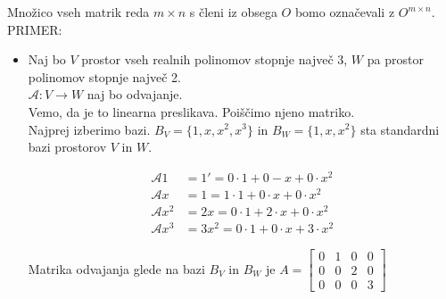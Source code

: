 \documentclass[a4paper,12pt]{article}
\begin{document}
Množico vseh matrik reda $m\times n$ s členi iz obsega $O$ bomo označevali z $O^{m\times n}$. \\

PRIMER:
\begin{itemize}
	\item Naj bo $V$ prostor vseh realnih polinomov stopnje največ 3, $W$ pa prostor polinomov stopnje največ 2. \\
	
	$\mathcal{A}:V\to W$ naj bo odvajanje. \\

	Vemo, da je to linearna preslikava. Poiščimo njeno matriko.\\

	Najprej izberimo bazi. $B_V=\{1,x,x^2,x^3\}$ in $B_W=\{1,x,x^2\}$ sta standardni bazi prostorov $V$ in $W$. 

\begin{align*}
	\mathcal{A}1&=1'=0\cdot 1+0-x+0\cdot x^2 \\
	\mathcal{A}x&=1=1\cdot 1 +0\cdot x+0\cdot x^2 \\
	\mathcal{A}x^2&=2x=0\cdot 1 +2\cdot x + 0 \cdot x^2 \\
	\mathcal{A}x^3&=3x^2=0\cdot 1+0\cdot x+3\cdot x^2
\end{align*}

Matrika odvajanja glede na bazi $B_V$ in $B_W$ je 
$A=
\begin{bmatrix}
	0&1&0&0\\
	0&0&2&0\\
	0&0&0&3
\end{bmatrix}$
\end{itemize}
\end{document}
